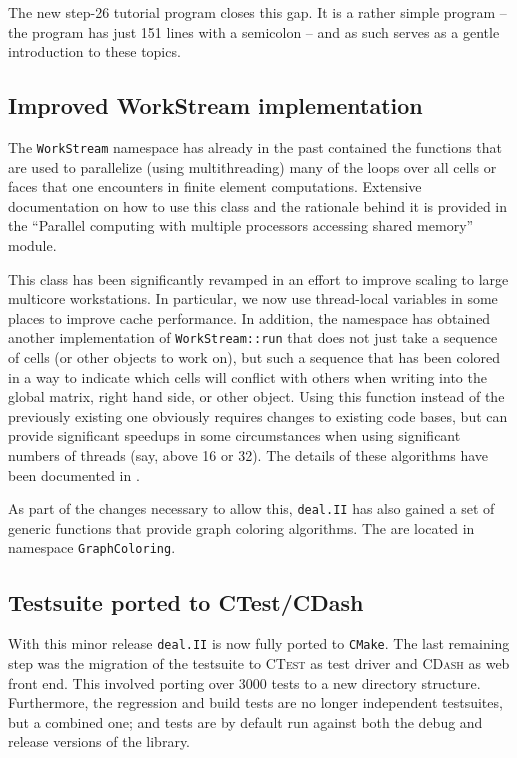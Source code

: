 \documentclass{siamltex}
\newcommand{\specialword}[1]{\texttt{#1}}
\newcommand{\dealii}{{\specialword{deal.II}}}
\newcommand{\cmake}{{\specialword{CMake}}}
\begin{document}
The new step-26 tutorial program closes this gap. It is a rather simple
program -- the program has just 151 lines with a semicolon -- and as such
serves as a gentle introduction to these topics.


\subsection{Improved WorkStream implementation}
\label{sec:threading}
The \texttt{WorkStream} namespace has already in the past contained the
functions that are used to parallelize (using multithreading) many of the loops over all cells or
faces that one encounters in finite element computations. Extensive
documentation on how to use this class and the rationale behind it is provided
in the ``Parallel computing with multiple processors accessing shared memory''
module.

This class has been significantly revamped in an effort to improve scaling to
large multicore workstations. In particular, we now use thread-local variables
in some places to improve cache performance. In addition, the namespace has
obtained another implementation of \texttt{WorkStream::run} that does not just
take a sequence of cells (or other objects to work on), but such a sequence
that has been colored in a way to indicate which cells will conflict with
others when writing into the global matrix, right hand side, or other
object. Using this function instead of the previously existing one obviously
requires changes to existing code bases, but can provide significant speedups
in some circumstances when using significant numbers of threads (say, above 16
or 32). The details of these algorithms have been documented in \cite{TKB13}.

As part of the changes necessary to allow this, \dealii{} has also gained a
set of generic functions that provide graph coloring algorithms. The are
located in namespace \texttt{GraphColoring}.



\subsection{Testsuite ported to CTest/CDash}
\label{sec:testsuite}

With this minor release \dealii{} is now fully ported to \cmake. The last
remaining step was the migration of the testsuite to \textsc{CTest} as test
driver and \textsc{CDash} as web front end. This involved porting over 3000
tests to a new directory structure. Furthermore, the regression and build
tests are no longer independent testsuites, but a combined one; and tests
are by default run against both the debug and release versions of the
library.
\end{document}
